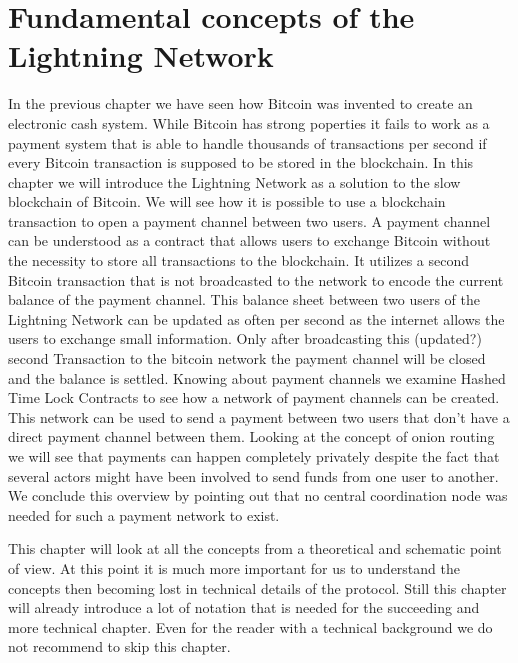 \documentclass[a4paper,12pt,oneside,openany]{book}
\begin{document}
\chapter{Fundamental concepts of the Lightning Network}
In the previous chapter we have seen how Bitcoin was invented to create an electronic cash system.
While Bitcoin has strong poperties it fails to work as a payment system that is able to handle thousands of transactions per second if every Bitcoin transaction is supposed to be stored in the blockchain.
In this chapter we will introduce the Lightning Network as a solution to the slow blockchain of Bitcoin.
We will see how it is possible to use a blockchain transaction to open a payment channel between two users.
A payment channel can be understood as a contract that allows users to exchange Bitcoin without the necessity to store all transactions to the blockchain.
It utilizes a second Bitcoin transaction that is not broadcasted to the network to encode the current balance of the payment channel.
This balance sheet between two users of the Lightning Network can be updated as often per second as the internet allows the users to exchange small information.
Only after broadcasting this (updated?) second Transaction to the bitcoin network the payment channel will be closed and the balance is settled.
Knowing about payment channels we examine Hashed Time Lock Contracts to see how a network of payment channels can be created.
This network can be used to send a payment between two users that don't have a direct payment channel between them.
Looking at the concept of onion routing we will see that payments can happen completely privately despite the fact that several actors might have been involved to send funds from one user to another.
We conclude this overview by pointing out that no central coordination node was needed for such a payment network to exist.

This chapter will look at all the concepts from a theoretical and schematic point of view.
At this point it is much more important for us to understand the concepts then becoming lost in technical details of the protocol.
Still this chapter will already introduce a lot of notation that is needed for the succeeding and more technical chapter.
Even for the reader with a technical background we do not recommend to skip this chapter.
\end{document}
